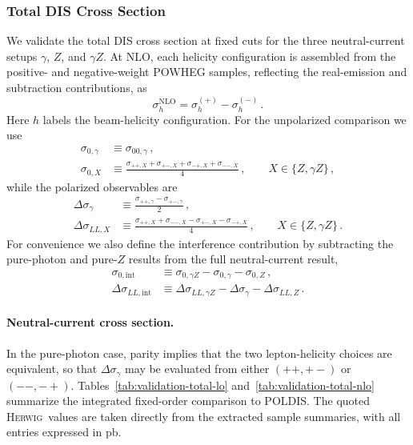 \documentclass[a4paper,11pt]{article}
\newcommand{\Herwig}{\textsc{Herwig}}
\newcommand{\POLDIS}{\textsc{POLDIS}}
\begin{document}
\subsubsection{Total DIS Cross Section}
We validate the total DIS cross section at fixed cuts for the three
neutral-current setups $\gamma$, $Z$, and $\gamma Z$. At NLO, each helicity
configuration is assembled from the positive- and negative-weight POWHEG
samples, reflecting the real-emission and subtraction contributions, as
\begin{equation}
  \sigma_h^{\mathrm{NLO}}
  =
  \sigma_h^{(+)}
  -
  \sigma_h^{(-)}\,.
\end{equation}
Here $h$ labels the beam-helicity configuration.
For the unpolarized comparison we use
\begin{align}
  \sigma_{0,\gamma} &\equiv \sigma_{00,\gamma}\,,
  \\
  \sigma_{0,X} &\equiv
  \frac{\sigma_{++,X}+\sigma_{+-,X}+\sigma_{-+,X}+\sigma_{--,X}}{4}\,,
  \qquad X\in\{Z,\gamma Z\}\,,
\end{align}
while the polarized observables are
\begin{align}
  \Delta\sigma_{\gamma}
  &\equiv
  \frac{\sigma_{++,\gamma}-\sigma_{+-,\gamma}}{2}\,,
  \\
  \Delta\sigma_{LL,X}
  &\equiv
  \frac{\sigma_{++,X}+\sigma_{--,X}-\sigma_{+-,X}-\sigma_{-+,X}}{4}\,,
  \qquad X\in\{Z,\gamma Z\}\,.
\end{align}
For convenience we also define the interference contribution by subtracting the
pure-photon and pure-$Z$ results from the full neutral-current result,
\begin{align}
  \sigma_{0,\mathrm{int}}
  &\equiv
  \sigma_{0,\gamma Z}-\sigma_{0,\gamma}-\sigma_{0,Z}\,,
  \\
  \Delta\sigma_{LL,\mathrm{int}}
  &\equiv
  \Delta\sigma_{LL,\gamma Z}-\Delta\sigma_{\gamma}-\Delta\sigma_{LL,Z}\,.
\end{align}
\paragraph{Neutral-current cross section.}
In the pure-photon case, parity implies that the two lepton-helicity choices
are equivalent, so that $\Delta\sigma_\gamma$ may be evaluated from either
$(++, +-)$ or $(--,-+)$. Tables~\ref{tab:validation-total-lo}
and~\ref{tab:validation-total-nlo} summarize the integrated fixed-order
comparison to \POLDIS. The quoted \Herwig\ values are taken
directly from the extracted sample summaries, with all entries expressed in pb.
\end{document}
